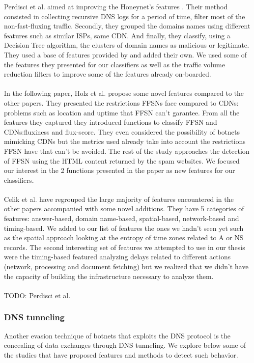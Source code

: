 Perdisci et al. \cite{ff2} aimed at improving the Honeynet's features \cite{honeynet}. Their method consisted in collecting recursive DNS logs for a period of time, filter most of the non-fast-fluxing traffic. Secondly, they grouped the domains names using different features such as similar ISPs, same CDN. And finally, they classify, using a Decision Tree algorithm, the clusters of domain names as malicious or legitimate. They used a base of features provided by \cite{fluXOR} and added their own. We used some of the features they presented for our classifiers as well as the traffic volume reduction filters to improve some of the features already on-boarded. \\
\\
In the following paper, Holz et al. \cite{ff3} propose some novel features compared to the other papers. They presented the restrictions FFSNs face compared to CDNs: problems such as location and uptime that FFSN can't garantee. From all the features they captured they introduced functions to classify FFSN and CDNs:fluxiness and flux-score. They even considered the possibility of botnets mimicking CDNs but the metrics used already take into account the restrictions FFSN have that can't be avoided. The rest of the study approaches the detection of FFSN using the HTML content returned by the spam websites. We focused our interest in the 2 functions presented in the paper as new features for our classifiers.\\
\\
Celik et al. \cite{ff4} have regrouped the large majority of features encountered in the other papers accompanied with some novel additions. They have 5 categories of features: answer-based, domain name-based, spatial-based, network-based and timing-based. We added to our list of features the ones we hadn't seen yet such as the spatial approach looking at the entropy of time zones related to A or NS records. The second interesting set of features we attempted to use in our thesis were the timing-based featured analyzing delays related to different actions (network, processing and document fetching) but we realized that we didn't have the capacity of building the infrastructure necessary to analyze them.\\
\\
TODO: Perdisci et al. \cite{ff} 


\subsubsection{DNS tunneling}
Another evasion technique of botnets that exploits the DNS protocol is the concealing of data exchanges through DNS tunneling. We explore below some of the studies that have proposed features and methods to detect such behavior.

